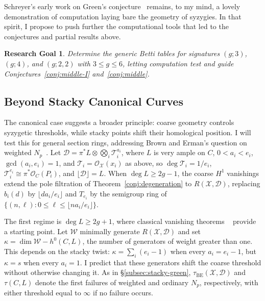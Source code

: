 \documentclass[11pt,reqno]{amsart}
\newtheorem{goal}[lemma]{Research Goal}
\theoremstyle{remark}
\newcommand{\BE}{\operatorname{BE}}
\newcommand{\cD}{\mathcal{D}}
\newcommand{\cO}{\mathcal{O}}
\newcommand{\cT}{\mathcal{T}}
\newcommand{\cW}{\mathcal{W}}
\newcommand{\cX}{\mathcal{X}}
\begin{document}
Schreyer's early work on Green's conjecture~\cite{schreyer91} remains, to my mind, a lovely demonstration of computation laying bare the geometry of syzygies. In that spirit, I propose to push further the computational tools that led to the conjectures and partial results above.
\begin{goal}
Determine the generic Betti tables for signatures $(g;3)$, $(g;4)$, and $(g;2,2)$ with $3\leq g\leq 6$, letting computation test and guide Conjectures~\ref{conj:middle-I} and~\ref{conj:middle}.
\end{goal}

\subsection{Beyond Stacky Canonical Curves}\label{subsec:stacks-further}

The canonical case suggests a broader principle: coarse geometry controls syzygetic thresholds, while stacky points shift their homological position. I will test this for general section rings, addressing Brown and Erman's question on weighted $N_p$~\cite[Ques.~7.6]{brownErman25}. Let $\cD=\pi^*L\otimes\bigotimes_i\cT_i^{a_i}$, where $L$ is very ample on $C$, $0<a_i<e_i$, $\gcd(a_i,e_i)=1$, and $\cT_i=\cO_{\cX}(x_i)$ as above, so $\deg\cT_i=1/e_i$, $\cT_i^{e_i}\cong\pi^*\cO_C(P_i)$, and $\lfloor\cD\rfloor=L$. When $\deg L\geq2g-1$, the coarse $H^1$ vanishings extend the pole filtration of Theorem~\ref{conj:degeneration} to $R(\cX,\cD)$, replacing $b_i(d)$ by $\lfloor da_i/e_i\rfloor$ and $T_{e_i}$ by the semigroup ring of $\{(n,\ell):0\leq\ell\leq\lfloor na_i/e_i\rfloor\}$.

The first regime is $\deg L\geq2g+1$, where classical vanishing theorems ~\cite{green84-I,greenLazarsfeld88} provide a starting point. Let $\cW$ minimally generate $R(\cX,\cD)$ and set $\kappa=\dim\cW-h^0(C,L)$, the number of generators of weight greater than one. This depends on the stacky twist: $\kappa=\sum_i(e_i-1)$ when every $a_i=e_i-1$, but $\kappa=s$ when every $a_i=1$. I predict that these generators shift the coarse threshold without otherwise changing it. As in \S\ref{subsec:stacky-green}, $\tau_{\BE}(\cX,\cD)$ and $\tau(C,L)$ denote the first failures of weighted and ordinary $N_p$, respectively, with either threshold equal to $\infty$ if no failure occurs.
\end{document}
